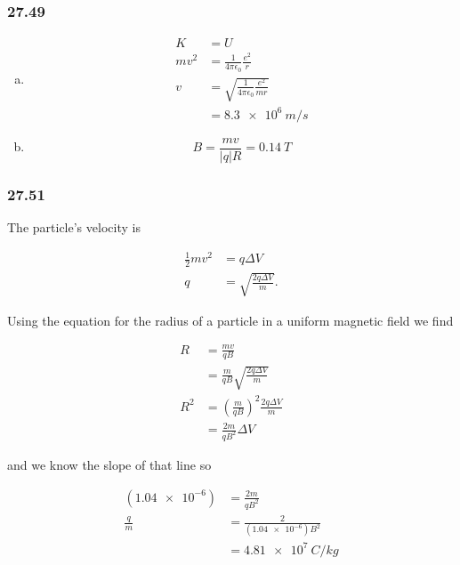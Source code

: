 \documentclass{article}
\begin{document}
\subsubsection{27.49}

\begin{enumerate}[(a)]
  \item

        \begin{align*}
          K     & = U                                                 \\
          m v^2 & = \frac{1}{4 \pi \epsilon_0} \frac{e^2}{r}          \\
          v     & = \sqrt{\frac{1}{4 \pi \epsilon_0} \frac{e^2}{m r}} \\
                & = \qty{8.3e6}{m/s}
        \end{align*}

  \item \[B = \frac{m v}{|q| R} = \qty{0.14}{T}\]
\end{enumerate}

\subsubsection{27.51}

The particle's velocity is

\begin{align*}
  \frac{1}{2} m v^2 & = q \Delta V                     \\
  q                 & = \sqrt{\frac{2 q \Delta V}{m}}.
\end{align*}

Using the equation for the radius of a particle in a uniform magnetic field we find

\begin{align*}
  R   & = \frac{m v}{q B}                                       \\
      & = \frac{m}{q B} \sqrt{\frac{2 q \Delta V}{m}}           \\
  R^2 & = \left( \frac{m}{q B} \right)^2 \frac{2 q \Delta V}{m} \\
      & = \frac{2 m}{q B^2} \Delta V
\end{align*}

and we know the slope of that line so

\begin{align*}
  (\num{1.04e-6}) & = \frac{2 m}{q B^2}             \\
  \frac{q}{m}     & = \frac{2}{(\num{1.04e-6}) B^2} \\
                  & = \qty{4.81e7}{C/kg}
\end{align*}
\end{document}
